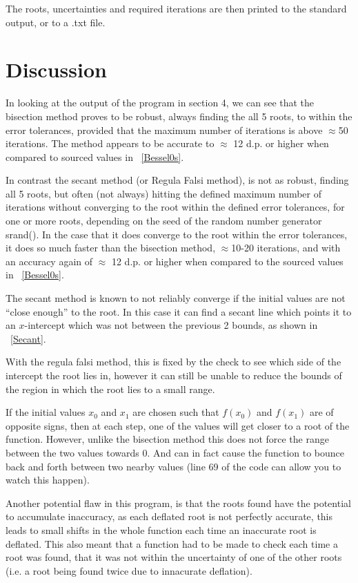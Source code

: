 \documentclass{article}
\newcommand{\figref}[2][\figurename~]{#1\ref{#2}}
\begin{document}
The roots, uncertainties and required iterations are then printed to the standard output, or to a .txt file.



\section{Discussion}

In looking at the output of the program in section 4, we can see that the bisection method proves to be robust, always finding the all 5 roots, to within the error tolerances, provided that the maximum number of iterations is above $\approx$50 iterations. The method appears to be accurate to $\approx$ 12 d.p. or higher when compared to sourced values in \figref{Bessel0s}.

In contrast the secant method (or Regula Falsi method), is not as robust, finding all 5 roots, but often (not always) hitting the defined maximum number of iterations without converging to the root within the defined error tolerances, for one or more roots, depending on the seed of the random number generator srand(). In the case that it does converge to the root within the error tolerances, it does so much faster than the bisection method, $\approx$10-20 iterations, and with an accuracy again of $\approx$ 12 d.p. or higher when compared to the sourced values in \figref{Bessel0s}.

The secant method is known to not reliably converge if the initial values are not ``close enough'' to the root. In this case it can find a secant line which points it to an $x$-intercept which was not between the previous 2 bounds, as shown in \figref{Secant}.

With the regula falsi method, this is fixed by the check to see which side of the intercept the root lies in, however it can still be unable to reduce the bounds of the region in which the root lies to a small range.

If the initial values $x_0$ and $x_1$ are chosen such that $f(x_0)$ and $f(x_1)$ are of opposite signs, then at each step, one of the values will get closer to a root of the function. However, unlike the bisection method this does not force the range between the two values towards 0. And can in fact cause the function to bounce back and forth between two nearby values (line 69 of the code can allow you to watch this happen). 

Another potential flaw in this program, is that the roots found have the potential to accumulate inaccuracy, as each deflated root is not perfectly accurate, this leads to small shifts in the whole function each time an inaccurate root is deflated. This also meant that a function had to be made to check each time a root was found, that it was not within the uncertainty of one of the other roots (i.e. a root being found twice due to innacurate deflation).
\end{document}
